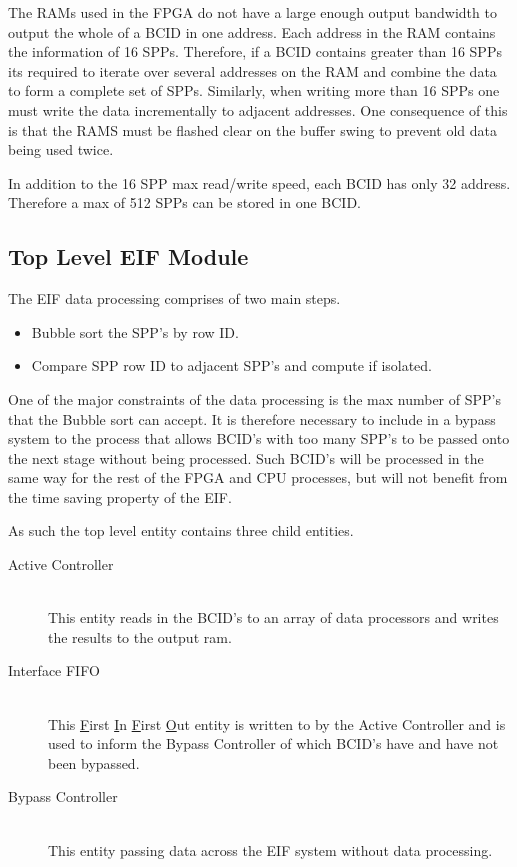 			The RAMs used in the FPGA do not have a large enough output bandwidth to output the whole of a BCID in one address.
			Each address in the RAM contains the information of 16 SPPs.
			Therefore, if a BCID contains greater than 16 SPPs its required to iterate over several addresses on the RAM and combine the data to form a complete set of SPPs.
			Similarly, when writing more than 16 SPPs one must write the data incrementally to adjacent addresses.
			One consequence of this is that the RAMS must be flashed clear on the buffer swing to prevent old data being used twice.

			In addition to the 16 SPP max read/write speed, each BCID has only 32 address.
			Therefore a max of 512 SPPs can be stored in one BCID.

	

	\subsection{Top Level EIF Module} %
	\label{sub:top_level_processing}
	
		The EIF data processing comprises of two main steps.

		\begin{itemize}
			\item Bubble sort the SPP's by row ID.
			\item Compare SPP row ID to adjacent SPP's and compute if isolated. 
		\end{itemize}

		One of the major constraints of the data processing is the max number of SPP's that the Bubble sort can accept.
		It is therefore necessary to include in a bypass system to the process that allows BCID's with too many SPP's to be passed onto the next stage without being processed.
		Such BCID's will be processed in the same way for the rest of the FPGA and CPU processes, but will not benefit from the time saving property of the EIF.

		As such the top level entity contains three child entities.

		\begin{description}
			\item[Active Controller] \hfill \\
				This entity reads in the BCID's to an array of data processors and writes the results to the output ram.
			\item[Interface FIFO] \hfill \\
				This \underline{F}irst \underline{I}n \underline{F}irst \underline{O}ut entity is written to by the Active Controller and is used to inform the Bypass Controller of which BCID's have and have not been bypassed.
			\item[Bypass Controller] \hfill \\
				This entity passing data across the EIF system without data processing.
		\end{description}

